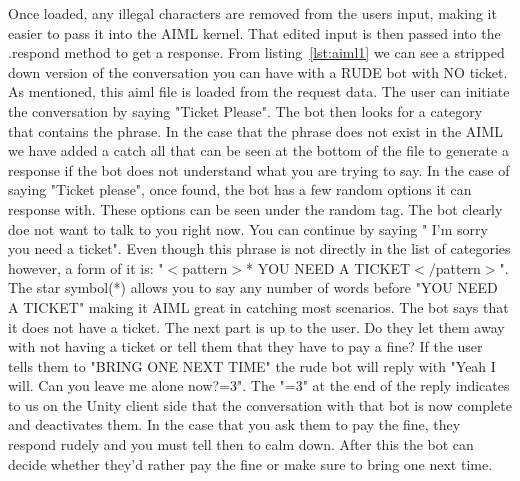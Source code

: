 Once loaded, any illegal characters are removed from the users input, making it easier to pass it into the AIML kernel. That edited input is then passed into the .respond method to get a response. From listing~\ref{lst:aiml1} we can see a stripped down version of the conversation you can have with a RUDE bot with NO ticket. As mentioned, this aiml file is loaded from the request data. The user can initiate the conversation by saying "Ticket Please". The bot then looks for a category that contains the phrase. In the case that the phrase does not exist in the AIML we have added a catch all that can be seen at the bottom of the file to generate a response if the bot does not understand what you are trying to say. In the case of saying "Ticket please", once found, the bot has a few random options it can response with. These options can be seen under the random tag. The bot clearly doe not want to talk to you right now. You can continue by saying " I'm sorry you need a ticket". Even though this phrase is not directly in the list of categories however, a form of it is: "$<$pattern$>$* YOU NEED A TICKET$</$pattern$>$". The star symbol(*) allows you to say any number of words before "YOU NEED A TICKET" making it AIML great in catching most scenarios. The bot says that it does not have a ticket. The next part is up to the user. Do they let them away with not having a ticket or tell them that they have to pay a fine? If the user tells them to "BRING ONE NEXT TIME" the rude bot will reply with "Yeah I will. Can you leave me alone now?=3". The "=3" at the end of the reply indicates to us on the Unity client side that the conversation with that bot is now complete and deactivates them. In the case that you ask them to pay the fine, they respond rudely and you must tell then to calm down. After this the bot can decide whether they'd rather pay the fine or make sure to bring one next time.

